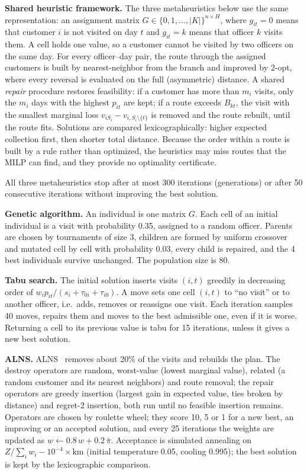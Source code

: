 \documentclass[11pt,a4paper]{article}
\begin{document}
\textbf{Shared heuristic framework.} The three metaheuristics below use the
same representation: an assignment matrix
$G\in\{0,1,\dots,|K|\}^{n\times H}$, where $g_{it}=0$ means that customer $i$
is not visited on day $t$ and $g_{it}=k$ means that officer $k$ visits them.
A cell holds one value, so a customer cannot be visited by two officers on
the same day. For every officer--day pair, the route through the assigned
customers is built by nearest-neighbor from the branch and improved by
2-opt, where every reversal is evaluated on the full (asymmetric) distance.
A shared \emph{repair} procedure restores feasibility: if a customer has more
than $m_i$ visits, only the $m_i$ days with the highest $p_{it}$ are kept; if
a route exceeds $B_{kt}$, the visit with the smallest marginal loss
$v_{iS_i}-v_{i,S_i\setminus\{t\}}$ is removed and the route rebuilt, until
the route fits. Solutions are compared lexicographically: higher expected
collection first, then shorter total distance. Because the order within a
route is built by a rule rather than optimized, the heuristics may miss
routes that the MILP can find, and they provide no optimality certificate.

All three metaheuristics stop after at most 300 iterations (generations)
or after 50 consecutive iterations without improving the best solution.

\textbf{Genetic algorithm.} An individual is one matrix $G$. Each cell of an
initial individual is a visit with probability 0.35, assigned to a random
officer. Parents are chosen by tournaments of size 3, children are formed by
uniform crossover and mutated cell by cell with probability 0.03, every child
is repaired, and the 4 best individuals survive unchanged. The population
size is 80.

\textbf{Tabu search.} The initial solution inserts visits $(i,t)$ greedily in
decreasing order of $w_ip_{it}/(s_i+\tau_{0i}+\tau_{i0})$. A move sets one
cell $(i,t)$ to ``no visit'' or to another officer, i.e.\ adds, removes or
reassigns one visit. Each iteration samples 40 moves, repairs them and moves
to the best admissible one, even if it is worse. Returning a cell to its
previous value is tabu for 15 iterations, unless it gives a new best
solution.

\textbf{ALNS.} ALNS~\cite{ropke2006} removes about 20\% of the visits and
rebuilds the plan. The destroy operators are random, worst-value (lowest
marginal value), related (a random customer and its nearest neighbors) and
route removal; the repair operators are greedy insertion (largest gain in
expected value, ties broken by distance) and regret-2 insertion, both run
until no feasible insertion remains. Operators are chosen by roulette wheel;
they score 10, 5 or 1 for a new best, an improving or an accepted solution,
and every 25 iterations the weights are updated as
$w\leftarrow0.8\,w+0.2\,\bar\pi$. Acceptance is simulated annealing on
$Z/\sum_i w_i-10^{-4}\times\text{km}$ (initial temperature 0.05, cooling
0.995); the best solution is kept by the lexicographic comparison.
\end{document}
